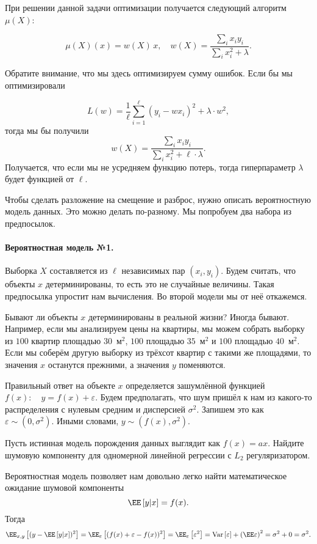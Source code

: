 \documentclass[12pt,fleqn]{article}
\begin{document}
При решении данной задачи оптимизации получается следующий алгоритм $\mu(X)$:

$$
\mu(X)(x) = w(X ) \,x, \quad w(X) = \dfrac{\sum_i x_i y_i}{\sum_i x_i^2 + \lambda}.
$$

Обратите внимание, что мы здесь оптимизируем сумму ошибок. Если бы мы оптимизировали 

$$
L(w) = \frac{1}{\ell} \sum_{i=1}^\ell (y_i - w x_i)^2 + \lambda \cdot w^2,
$$
тогда мы бы получили 
$$
w(X) = \dfrac{\sum_i x_i y_i}{\sum_i x_i^2 + \ell \cdot \lambda}.
$$ 
Получается, что если мы не усредняем функцию потерь, тогда гиперпараметр $\lambda$ будет функцией от $\ell.$

Чтобы сделать разложение на смещение и разброс, нужно описать вероятностную модель данных.
Это можно делать по-разному.
Мы попробуем два набора из предпосылок.

\paragraph{Вероятностная модель №1.}
Выборка $X$ составляется из $\ell$ независимых пар $(x_i, y_i)$.
Будем считать, что объекты $x$ детерминированы, то есть это не случайные величины.
Такая предпосылка упростит нам вычисления.
Во второй модели мы от неё откажемся.

Бывают ли объекты $x$ детерминированы в реальной жизни?
Иногда бывают.
Например, если мы анализируем цены на квартиры, мы можем собрать выборку из $100$ квартир площадью $30$~м$^2$, $100$ площадью $35$~м$^2$ и $100$ площадью $40$~м$^2.$
Если мы соберём другую выборку из трёхсот квартир с такими же площадями, то значения $x$ останутся прежними, а значения $y$ поменяются.

Правильный ответ на объекте $x$ определяется зашумлённой функцией $f(x):\quad y = f(x) + \varepsilon$.
Будем предполагать, что шум пришёл к нам из какого-то распределения с нулевым средним и дисперсией $\sigma^2$.
Запишем это как $\varepsilon \sim (0, \sigma^2).$
Иными словами, $y \sim (f(x), \sigma^2).$

\begin{vkProblem}
Пусть истинная модель порождения данных выглядит как $f(x) = ax$.
Найдите шумовую компоненту для одномерной линейной регрессии с $L_2$ регуляризатором.
\end{vkProblem}
\begin{esSolution}
    Вероятностная модель позволяет нам довольно легко найти математическое ожидание шумовой компоненты
    $$
    \EE\left[y|x\right] = f(x).
    $$
    Тогда
    $$
    \EE_{x, y}\left[(y - \EE\left[y|x\right] )^2\right] = 
    \EE_{\varepsilon}\left[(f(x) + \varepsilon - f(x) )^2\right] = 
    \EE_{\varepsilon}\left[\varepsilon^2\right] = \text{Var}\left[\varepsilon\right] + \left(\EE\varepsilon\right)^2 = \sigma^2 + 0 = \sigma^2.
    $$
\end{esSolution}
\end{document}
